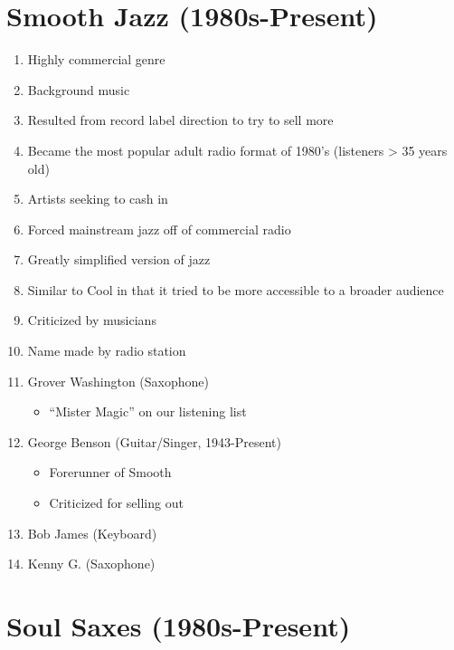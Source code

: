 \documentclass[]{article}
\providecommand{\tightlist}{%
  \setlength{\itemsep}{0pt}\setlength{\parskip}{0pt}}
\begin{document}
\section{Smooth Jazz (1980s-Present)}\label{smooth-jazz-1980s-present}

\begin{enumerate}
\def\labelenumi{\arabic{enumi}.}
\tightlist
\item
  Highly commercial genre
\item
  Background music
\item
  Resulted from record label direction to try to sell more
\item
  Became the most popular adult radio format of 1980's (listeners
  \textgreater{} 35 years old)
\item
  Artists seeking to cash in
\item
  Forced mainstream jazz off of commercial radio
\item
  Greatly simplified version of jazz
\item
  Similar to Cool in that it tried to be more accessible to a broader
  audience
\item
  Criticized by musicians
\item
  Name made by radio station
\item
  Grover Washington (Saxophone)

  \begin{itemize}
  \tightlist
  \item
    ``Mister Magic'' on our listening list
  \end{itemize}
\item
  George Benson (Guitar/Singer, 1943-Present)

  \begin{itemize}
  \tightlist
  \item
    Forerunner of Smooth
  \item
    Criticized for selling out
  \end{itemize}
\item
  Bob James (Keyboard)
\item
  Kenny G. (Saxophone)
\end{enumerate}

\section{Soul Saxes (1980s-Present)}\label{soul-saxes-1980s-present}
\end{document}
